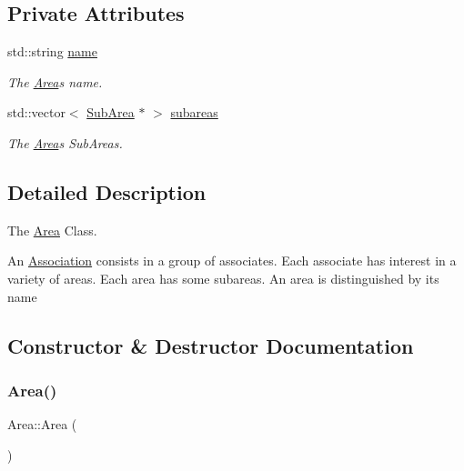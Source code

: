 \subsection*{Private Attributes}
\begin{DoxyCompactItemize}
\item 
std\+::string \hyperlink{classArea_a24201719de9d9dfef7a720c036529dd7}{name}
\begin{DoxyCompactList}\small\item\em The \hyperlink{classArea}{Area}\textquotesingle{}s name. \end{DoxyCompactList}\item 
std\+::vector$<$ \hyperlink{classSubArea}{Sub\+Area} $\ast$ $>$ \hyperlink{classArea_af5eafd40b41ae847a009feef631ce07f}{subareas}
\begin{DoxyCompactList}\small\item\em The \hyperlink{classArea}{Area}\textquotesingle{}s Sub\+Areas. \end{DoxyCompactList}\end{DoxyCompactItemize}


\subsection{Detailed Description}
The \hyperlink{classArea}{Area} Class. 

An \hyperlink{classAssociation}{Association} consists in a group of associates. Each associate has interest in a variety of areas. Each area has some subareas. An area is distinguished by its name 

\subsection{Constructor \& Destructor Documentation}
\mbox{\label{classArea_aa92851fcffb0a9f1c6c8c283204f7003}} 
\subsubsection{\texorpdfstring{Area()}{Area()}\hspace{0.1cm}{\footnotesize\ttfamily [1/2]}}
{\footnotesize\ttfamily Area\+::\+Area (\begin{DoxyParamCaption}{ }\end{DoxyParamCaption})}



